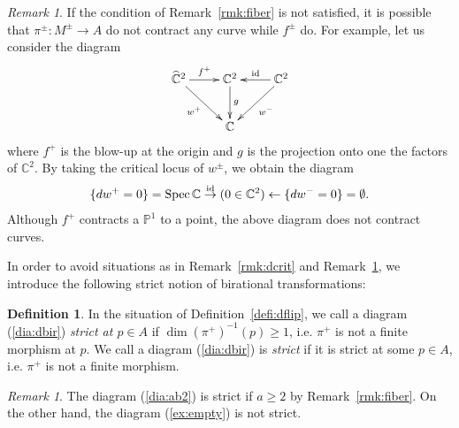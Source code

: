 \documentclass[11pt]{amsart}
\theoremstyle{plain}
\theoremstyle{definition}
\newtheorem{defi}[thm]{Definition}
\theoremstyle{remark}
\newtheorem{rmk}[thm]{Remark}
\newcommand{\id}{\textrm{id}}
\newcommand{\Spec}{\mathop{\rm Spec}\nolimits}
\begin{document}
\begin{rmk}\label{rmk:contract}
If the condition of Remark~\ref{rmk:fiber} is not satisfied, 
it is possible that $\pi^{\pm} \colon M^{\pm} \to A$ 
do not contract any curve while 
$f^{\pm}$ do. 
For example, let us consider the diagram
\begin{align*}
\xymatrix{
\widehat{\mathbb{C}}^2 \ar[r]^-{f^{+}} \ar[rd]_-{w^+} 
& \mathbb{C}^2 \ar[d]^-{g} &
\ar[l]_-{\id} \mathbb{C}^2 \ar[ld]^-{w^-}\\
& \mathbb{C} &
}
\end{align*}
where $f^+$ is the blow-up at the origin
and $g$ is the projection onto one the factors of $\mathbb{C}^2$. 
By taking the critical locus of $w^{\pm}$, we obtain 
the diagram
\begin{align}\label{ex:empty}
\{dw^+=0\}=\Spec \mathbb{C} \stackrel{\id}{\to} (0 \in \mathbb{C}^2) 
\leftarrow \{dw^-=0\}=\emptyset.
\end{align}
Although $f^{+}$ contracts a $\mathbb{P}^1$ to a point, the above 
diagram does not contract curves. 
\end{rmk}

In order to avoid situations as in Remark~\ref{rmk:dcrit} and Remark~\ref{rmk:contract}, we introduce the 
following strict notion of birational transformations: 
\begin{defi}\label{defi:strict}
In the situation of Definition~\ref{defi:dflip},  
we call
a diagram (\ref{dia:dbir}) 
\textit{strict at $p \in A$}
if $\dim (\pi^{+})^{-1}(p) \ge 1$, i.e. 
$\pi^+$ is not a finite morphism at $p$.
We call a diagram (\ref{dia:dbir}) is
\textit{strict} if 
it is strict at some $p \in A$, i.e. 
$\pi^+$ is not a finite morphism. 
\end{defi}

\begin{rmk}
The diagram (\ref{dia:ab2}) is strict if $a\ge 2$ by Remark~\ref{rmk:fiber}. 
On the other hand, the diagram (\ref{ex:empty}) is not strict. 
\end{rmk}
\end{document}

